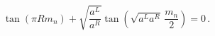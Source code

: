 \begin{equation}
\tan(\pi R m_n) + \sqrt{\frac{a^L}{a^R}} \tan(\sqrt{a^L a^R} \,
\frac{m_n}{2})=0 \, .
\end{equation}

